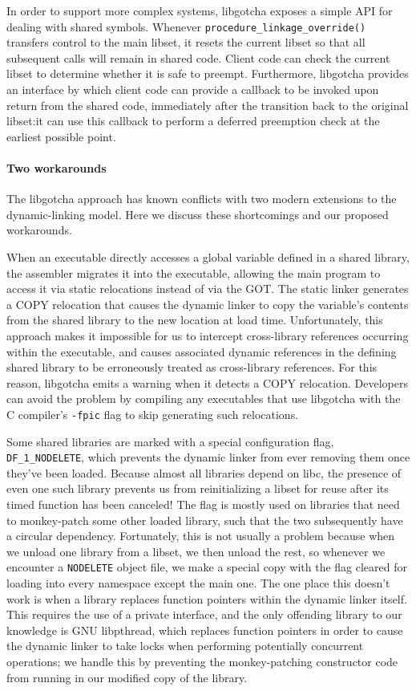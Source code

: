 In order to support more complex systems, libgotcha exposes a simple API for dealing
with shared symbols.  Whenever \texttt{procedure\_linkage\_override()} transfers
control to the main libset, it resets the current libset so that all subsequent calls
will remain in shared code.  Client code can check the current libset to determine
whether it is safe to preempt.  Furthermore, libgotcha provides an interface by which
client code can provide a callback to be invoked upon return from the shared code,
immediately after the transition back to the original libset:\@ it can use this
callback to perform a deferred preemption check at the earliest possible point.

\paragraph{Two workarounds}

The libgotcha approach has known conflicts with two modern extensions to the
dynamic-linking model.  Here we discuss these shortcomings and our proposed
workarounds.

When an executable directly accesses a global variable defined in a shared library,
the assembler migrates it into the executable, allowing the main program to access it
via static relocations instead of via the GOT.  The static linker generates a COPY
relocation that causes the dynamic linker to copy the variable's contents from the
shared library to the new location at load time.  Unfortunately, this approach makes
it impossible for us to intercept cross-library references occurring within the
executable, and causes associated dynamic references in the defining shared library
to be erroneously treated as cross-library references.  For this reason, libgotcha
emits a warning when it detects a COPY relocation.  Developers can avoid the problem
by compiling any executables that use libgotcha with the C compiler's \texttt{-fpic}
flag to skip generating such relocations.

Some shared libraries are marked with a special configuration flag,
\texttt{DF\_1\_NODELETE}, which prevents the dynamic linker from ever removing them
once they've been loaded.  Because almost all libraries depend on libc, the presence
of even one such library prevents us from reinitializing a libset for reuse after
its timed function has been canceled!  The flag is mostly used on libraries that need
to monkey-patch some other loaded library, such that the two subsequently have a
circular dependency.  Fortunately, this is not usually a problem because when we
unload one library from a libset, we then unload the rest, so whenever we encounter a
\texttt{NODELETE} object file, we make a special copy with the flag cleared for
loading into every namespace except the main one.  The one place this doesn't work is
when a library replaces function pointers within the dynamic linker itself.  This
requires the use of a private interface, and the only offending library to our
knowledge is GNU libpthread, which replaces function pointers in order to cause the
dynamic linker to take locks when performing potentially concurrent operations; we
handle this by preventing the monkey-patching constructor code from running in our
modified copy of the library.

